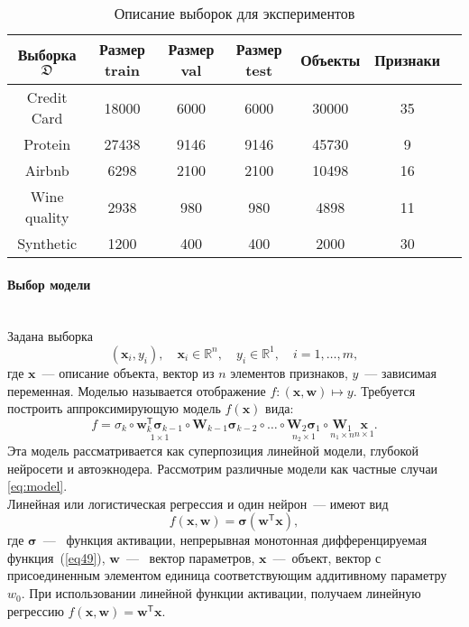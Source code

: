 \documentclass[12pt, twoside]{article}
\newcommand{\xb}{{\mathbf{x}}}
\newcommand{\sigmab}{{\boldsymbol{\sigma}}}
\newcommand{\x}{{\mathbf{x}}}
\newcommand{\w}{{\mathbf{W}}}
\newcommand{\wm}{{\mathbf{w}}}
\begin{document}
\begin{table}[!htbp]
\captionsetup{justification=raggedright,singlelinecheck=false}
\label{table1}
\caption{Описание выборок для экспериментов}
\footnotesize
\begin{center}
\centering
\begin{tabular}{ | c | c | c |c | c | c | c | }
\hline
Выборка $\mathfrak{D}$ & Размер train  & Размер val  & Размер test& Объекты & Признаки\\
\hline
Credit Card & 18000 & 6000& 6000 & 30000 & 35  \\
\hline
Protein & 27438 & 9146 & 9146 & 45730 & 9 \\
\hline
Airbnb & 6298 & 2100 & 2100 & 10498 & 16 \\
\hline
Wine quality & 2938 & 980 & 980 & 4898 & 11 \\
\hline
Synthetic & 1200 & 400 & 400 & 2000 & 30 \\
\hline
\end{tabular}
\end{center}
\end{table}

\paragraph{Выбор модели}
\\
Задана выборка 
\begin{equation}\label{eq3}
(\xb_i,y_i),\quad \xb_i \in \mathbb{R}^n,\quad y_i\in \mathbb{R}^1,\quad i=1,\dots,m,
\end{equation}
где $\xb$~--- описание объекта, вектор из $n$ элементов признаков, $y$~--- зависимая переменная. Моделью называется отображение $f:(\xb,\wm)\mapsto y$. Требуется построить аппроксимирующую модель $f(\x)$ вида:
\begin{equation}\label{eq:model}
f = \sigma_k\circ\underset{1\times1}{\wm_k^\mathsf{T}\sigmab_{k-1}}\circ\w_{k-1}\sigmab_{k-2}\circ\dots\circ\underset{n_2 \times 1}{\w_2\sigmab_1}\circ\underset{n_1 \times n}{\w_1}\underset{n \times 1}{\x}.
\end{equation}
Эта модель рассматривается как суперпозиция линейной модели, глубокой нейросети и автоэкнодера. Рассмотрим различные модели как частные случаи \eqref{eq:model}.
\\
Линейная или логистическая регрессия и один нейрон~--- имеют вид
\begin{equation}\label{eq11}
f(\xb,\wm)=\sigmab(\wm^\mathsf{T}\xb),
\end{equation}
где $\sigmab$~---~ функция активации, непрерывная монотонная дифференцируемая функция~(\ref{eq49}),  $\wm$~---~ вектор параметров, $\xb$~---~объект, вектор с присоединенным элементом единица соответствующим аддитивному параметру $w_0$. При использовании линейной функции активации,  получаем линейную регрессию $f(\xb,\wm)=\wm^\mathsf{T}\xb.$
\end{document}
